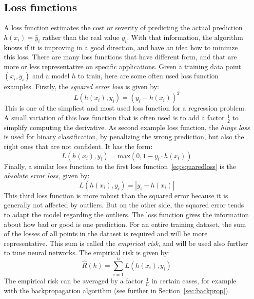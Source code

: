 \subsection{Loss functions}
A loss function estimates the cost or severity of predicting the actual prediction $h(x_i) = \hat{y}_i$ rather than the real value $y_i$. With that information, the algorithm knows if it is improving in a good direction, and have an idea how to minimze this loss. There are many loss functions that have different form, and that are more or less representative on specific applications. Given a training data point $(x_i, y_i)$ and a model $h$ to train, here are some often used loss function examples. Firstly, the \emph{squared error loss} is given by:
\begin{equation}
\label{eq:squaredloss}
  L(h(x_i), y_i) = (y_i - h(x_i))^2
\end{equation}
This is one of the simpliest and most used loss function for a regression problem. A small variation of this loss function that is often used is to add a factor $\frac{1}{2}$ to simplify computing the derivative. As second example loss function, the \emph{hinge loss} is used for binary classification, by penalizing the wrong prediction, but also the right ones that are not confident. It has the form:
\begin{equation}
  L(h(x_i), y_i) = \text{max} (0, 1 - y_i \cdot h(x_i))
\end{equation}
Finally, a similar loss function to the first loss function~\eqref{eq:squaredloss} is the \emph{absolute error loss}, given by:
\begin{equation}
  L(h(x_i), y_i) = |y_i - h(x_i)|
\end{equation}
This third loss function is more robust than the squared error because it is generally not affected by outliers. But on the other side, the squared error tends to adapt the model regarding the outliers. The loss function gives the information about how bad or good is one prediction. For an entire training dataset, the sum of the losses of all points in the dataset is required and will be more representative. This sum is called the \emph{empirical risk}, and will be used also further to tune neural networks. The empirical risk is given by:
\begin{equation}
  \hat{R}(h) = \sum^n_{i=1} L(h(x_i),y_i)
\end{equation}
The empirical risk can be averaged by a factor $\frac{1}{n}$ in certain cases, for example with the backpropagation algorithm (see further in Section~\ref{sec:backprop}).

